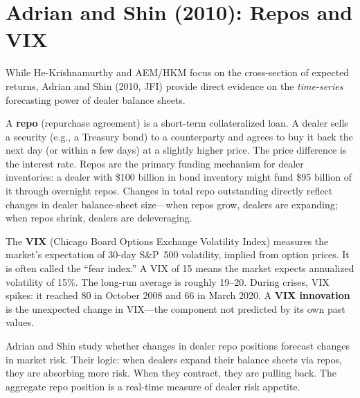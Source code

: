 \section{Adrian and Shin (2010): Repos and VIX}
\label{sec:adrian-shin}

While He-Krishnamurthy and AEM/HKM focus on the cross-section of expected returns, Adrian and Shin (2010, JFI) provide direct evidence on the \emph{time-series} forecasting power of dealer balance sheets.

\begin{prereq}
A \textbf{repo} (repurchase agreement) is a short-term collateralized loan. A dealer sells a security (e.g., a Treasury bond) to a counterparty and agrees to buy it back the next day (or within a few days) at a slightly higher price. The price difference is the interest rate. Repos are the primary funding mechanism for dealer inventories: a dealer with \$100 billion in bond inventory might fund \$95 billion of it through overnight repos. Changes in total repo outstanding directly reflect changes in dealer balance-sheet size---when repos grow, dealers are expanding; when repos shrink, dealers are deleveraging.
\end{prereq}

\begin{prereq}
The \textbf{VIX} (Chicago Board Options Exchange Volatility Index) measures the market's expectation of 30-day S\&P~500 volatility, implied from option prices. It is often called the ``fear index.'' A VIX of 15 means the market expects annualized volatility of 15\%. The long-run average is roughly 19--20. During crises, VIX spikes: it reached 80 in October 2008 and 66 in March 2020. A \textbf{VIX innovation} is the unexpected change in VIX---the component not predicted by its own past values.
\end{prereq}

Adrian and Shin study whether changes in dealer repo positions forecast changes in market risk. Their logic: when dealers expand their balance sheets via repos, they are absorbing more risk. When they contract, they are pulling back. The aggregate repo position is a real-time measure of dealer risk appetite.

